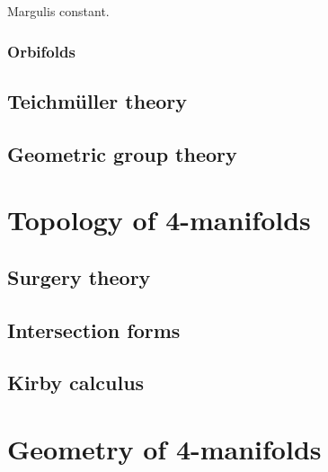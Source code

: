 \documentclass{../../large}
\begin{document}
\begin{prb}
\end{prb}

\begin{prb}
Margulis constant.
\end{prb}

\begin{prb}
\end{prb}


\section{Orbifolds}




\chapter{Teichm\"uller theory}
\section{}

\chapter{Geometric group theory}
\section{}


\part{Topology of 4-manifolds}
\chapter{Surgery theory}
\chapter{Intersection forms}
\chapter{Kirby calculus}


\part{Geometry of 4-manifolds}
\chapter{}
\chapter{}
\chapter{}
\end{document}
